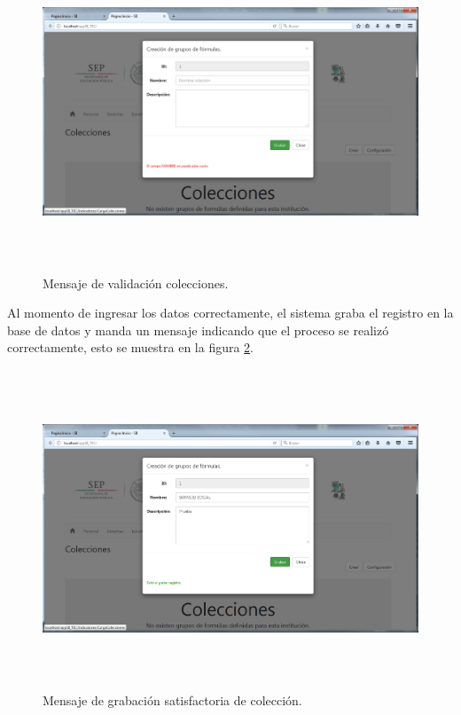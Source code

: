 			\begin{figure}[]
		        \centering
		        \includegraphics[width=16cm, height=9.5cm]{figuras/ColeccionesValida}
		        \caption{Mensaje de validaci\'on colecciones.}
		        \label{fig_ColeccionesValida}
		    \end{figure}

		    Al momento de ingresar los datos correctamente, el sistema graba el registro en la base de datos y manda un mensaje indicando que el proceso se realiz\'o correctamente, esto se muestra en la figura \ref{img_ColeccionesGraba}.\\

		    \begin{figure}[]
		        \centering
		        \includegraphics[width=16cm, height=9.5cm]{figuras/ColeccionesGraba}
		        \caption{Mensaje de grabaci\'on satisfactoria de colecci\'on.}
		        \label{img_ColeccionesGraba}
		    \end{figure}

